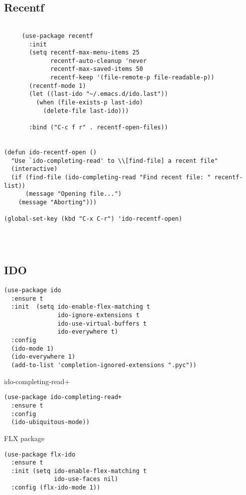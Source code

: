 \documentclass[12pt]{article}
\begin{document}
\subsection{Recentf}
\label{sec:orgb9a1a8c}
\begin{verbatim}

     (use-package recentf
       :init
       (setq recentf-max-menu-items 25
             recentf-auto-cleanup 'never
             recentf-max-saved-items 50
             recentf-keep '(file-remote-p file-readable-p))
       (recentf-mode 1)
       (let ((last-ido "~/.emacs.d/ido.last"))
         (when (file-exists-p last-ido)
           (delete-file last-ido)))

       :bind ("C-c f r" . recentf-open-files))


(defun ido-recentf-open ()
  "Use `ido-completing-read' to \\[find-file] a recent file"
  (interactive)
  (if (find-file (ido-completing-read "Find recent file: " recentf-list))
      (message "Opening file...")
    (message "Aborting")))

(global-set-key (kbd "C-x C-r") 'ido-recentf-open)




\end{verbatim}
\subsection{IDO}
\label{sec:orge523921}

\begin{verbatim}
(use-package ido
  :ensure t
  :init  (setq ido-enable-flex-matching t
               ido-ignore-extensions t
               ido-use-virtual-buffers t
               ido-everywhere t)
  :config
  (ido-mode 1)
  (ido-everywhere 1)
  (add-to-list 'completion-ignored-extensions ".pyc"))

\end{verbatim}
ido-completing-read+
\begin{verbatim}
(use-package ido-completing-read+
  :ensure t
  :config
  (ido-ubiquitous-mode))
\end{verbatim}

FLX package
\begin{verbatim}
(use-package flx-ido
  :ensure t
  :init (setq ido-enable-flex-matching t
              ido-use-faces nil)
  :config (flx-ido-mode 1))

\end{verbatim}
\end{document}
